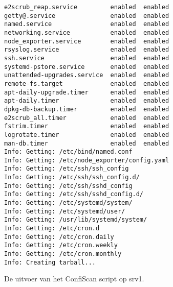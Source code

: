\begin{longlisting}
\begin{verbatim}
e2scrub_reap.service         enabled  enabled
getty@.service               enabled  enabled
named.service                enabled  enabled
networking.service           enabled  enabled
node_exporter.service        enabled  enabled
rsyslog.service              enabled  enabled
ssh.service                  enabled  enabled
systemd-pstore.service       enabled  enabled
unattended-upgrades.service  enabled  enabled
remote-fs.target             enabled  enabled
apt-daily-upgrade.timer      enabled  enabled
apt-daily.timer              enabled  enabled
dpkg-db-backup.timer         enabled  enabled
e2scrub_all.timer            enabled  enabled
fstrim.timer                 enabled  enabled
logrotate.timer              enabled  enabled
man-db.timer                 enabled  enabled
Info: Getting: /etc/bind/named.conf
Info: Getting: /etc/node_exporter/config.yaml
Info: Getting: /etc/ssh/ssh_config
Info: Getting: /etc/ssh/ssh_config.d/
Info: Getting: /etc/ssh/sshd_config
Info: Getting: /etc/ssh/sshd_config.d/
Info: Getting: /etc/systemd/system/
Info: Getting: /etc/systemd/user/
Info: Getting: /usr/lib/systemd/system/
Info: Getting: /etc/cron.d
Info: Getting: /etc/cron.daily
Info: Getting: /etc/cron.weekly
Info: Getting: /etc/cron.monthly
Info: Creating tarball...
  \end{verbatim}
  \caption{De uitvoer van het ConfiScan script op srv1.}
  \label{lst:bijlage-confiscan}
\end{longlisting}
